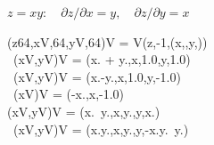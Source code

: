 \documentclass{article}
\begin{document}
\begin{preview}\begin{minipage}{19cm}
\small
$z=xy:\quad \partial z/\partial x=y,\quad\partial z/\partial y=x$
\begin{FortressCode}
(z\COLON{}64,x\COLONOP{}V,\COLON{}64,y\COLONOP{}V,\COLON{}64)\COLONOP{}V = V\bigl(z,-1,(x,,y,)\bigr) \\
\,  \mathord{+} (x\COLONOP{}V,y\COLONOP{}V)\COLONOP{}V = (x. + y.,x,1.0,y,1.0) \\
\, \mathord{-}(x\COLONOP{}V,y\COLONOP{}V)\COLONOP{}V = (x.-y.,x,1.0,y,-1.0) \\
\, \mathord{-}(x\COLONOP{}V)\COLONOP{}V = (-x.,x,-1.0) \\
 (x\COLONOP{}V,y\COLONOP{}V)\COLONOP{}V = (x.\, y.,x,y.,y,x.) \\
\, \mathord{/}(x\COLONOP{}V,y\COLONOP{}V)\COLONOP{}V = \left({\textstyle{}x.\over\textstyle{}y.},x,{\over\textstyle{}y.},y,-{\textstyle{}x.\over\textstyle{}y.\, y.}\right)
\end{FortressCode}
\end{minipage}\end{preview}
\end{document}

